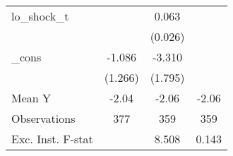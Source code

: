 {\begin{tabular}{l*{3}{c}}
\addlinespace
lo\_shock\_t  &                     &       0.063\sym{**} &                     \\
            &                     &     (0.026)         &                     \\
\addlinespace
\_cons      &      -1.086         &      -3.310\sym{*}  &                     \\
            &     (1.266)         &     (1.795)         &                     \\
\midrule
Mean Y      &       -2.04         &       -2.06         &       -2.06         \\
Observations&         377         &         359         &         359         \\
Exc. Inst. F-stat&                     &       8.508         &       0.143         \\
\bottomrule
\end{tabular}
}

